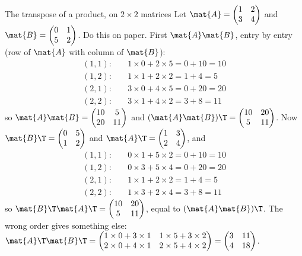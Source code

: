 \begin{worked}[label={we:linalg:abt}]{The transpose of a product, on $2\times2$ matrices}
Let $\mat{A} = \begin{pmatrix} 1 & 2 \\ 3 & 4 \end{pmatrix}$ and
$\mat{B} = \begin{pmatrix} 0 & 1 \\ 5 & 2 \end{pmatrix}$. Do this on paper.
First $\mat{A}\mat{B}$, entry by entry (row of $\mat{A}$ with column of $\mat{B}$):
\begin{align*}
(1,1):&\quad 1\times0 + 2\times5 = 0 + 10 = 10\\
(1,2):&\quad 1\times1 + 2\times2 = 1 + 4 = 5\\
(2,1):&\quad 3\times0 + 4\times5 = 0 + 20 = 20\\
(2,2):&\quad 3\times1 + 4\times2 = 3 + 8 = 11
\end{align*}
so $\mat{A}\mat{B} = \begin{pmatrix} 10 & 5 \\ 20 & 11 \end{pmatrix}$ and
$(\mat{A}\mat{B})\T = \begin{pmatrix} 10 & 20 \\ 5 & 11 \end{pmatrix}$.
Now $\mat{B}\T = \begin{pmatrix} 0 & 5 \\ 1 & 2 \end{pmatrix}$ and
$\mat{A}\T = \begin{pmatrix} 1 & 3 \\ 2 & 4 \end{pmatrix}$, and
\begin{align*}
(1,1):&\quad 0\times1 + 5\times2 = 0 + 10 = 10\\
(1,2):&\quad 0\times3 + 5\times4 = 0 + 20 = 20\\
(2,1):&\quad 1\times1 + 2\times2 = 1 + 4 = 5\\
(2,2):&\quad 1\times3 + 2\times4 = 3 + 8 = 11
\end{align*}
so $\mat{B}\T\mat{A}\T = \begin{pmatrix} 10 & 20 \\ 5 & 11 \end{pmatrix}$, equal to
$(\mat{A}\mat{B})\T$. The wrong order gives something else:
$\mat{A}\T\mat{B}\T = \begin{pmatrix} 1\times0+3\times1 & 1\times5+3\times2 \\
2\times0+4\times1 & 2\times5+4\times2 \end{pmatrix} = \begin{pmatrix} 3 & 11 \\ 4 & 18
\end{pmatrix}$.
\end{worked}


